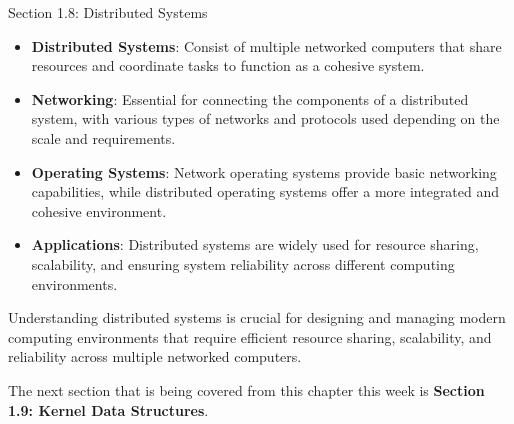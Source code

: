 \begin{notes}{Section 1.8: Distributed Systems}
\begin{highlight}
    \end{highlight}
    
    \begin{highlight}
    
    \begin{itemize}
        \item \textbf{Distributed Systems}: Consist of multiple networked computers that share resources and coordinate tasks to function as a cohesive system.
        \item \textbf{Networking}: Essential for connecting the components of a distributed system, with various types of networks and protocols used depending on the scale and requirements.
        \item \textbf{Operating Systems}: Network operating systems provide basic networking capabilities, while distributed operating systems offer a more integrated and cohesive environment.
        \item \textbf{Applications}: Distributed systems are widely used for resource sharing, scalability, and ensuring system reliability across different computing environments.
    \end{itemize}
    
    Understanding distributed systems is crucial for designing and managing modern computing environments that require efficient resource sharing, scalability, and reliability across multiple networked computers.
    
    \end{highlight}
\end{notes}

The next section that is being covered from this chapter this week is \textbf{Section 1.9: Kernel Data Structures}.

